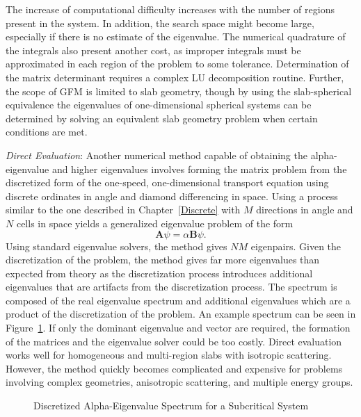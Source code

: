 The increase of computational difficulty increases with the number of regions present in the system. In addition, the search space might become large, especially if there is no estimate of the eigenvalue. The numerical quadrature of the integrals also present another cost, as improper integrals must be approximated in each region of the problem to some tolerance. Determination of the matrix determinant requires a complex LU decomposition routine. Further, the scope of GFM is limited to slab geometry, though by using the slab-spherical equivalence \cite{case1953introduction} the eigenvalues of one-dimensional spherical systems can be determined by solving an equivalent slab geometry problem when certain conditions are met.

\textit{Direct Evaluation}: Another numerical method capable of obtaining the alpha-eigen\-value and higher eigenvalues involves forming the matrix problem from the discretized form of the one-speed, one-dimensional transport equation \cite{modak_simple_2003} using discrete ordinates in angle and diamond differencing in space. Using a process similar to the one described in Chapter~\ref{Discrete} with $M$ directions in angle and $N$ cells in space yields a generalized eigenvalue problem of the form
\begin{equation}
\mathbf{A} \psi = \alpha \mathbf{B} \psi.
\label{eq:geneig}
\end{equation}
Using standard eigenvalue solvers, the method gives $NM$ eigenpairs. Given the discretization of the problem, the method gives far more eigenvalues than expected from theory as the discretization process introduces additional eigenvalues that are artifacts from the discretization process. The spectrum is composed of the real eigenvalue spectrum and additional eigenvalues which are a product of the discretization of the problem. An example spectrum can be seen in Figure~\ref{fig:NMSpec}. If only the dominant eigenvalue and vector are required, the formation of the matrices and the eigenvalue solver could be too costly. Direct evaluation works well for homogeneous and multi-region slabs with isotropic scattering. However, the method quickly becomes complicated and expensive for problems involving complex geometries, anisotropic scattering, and multiple energy groups.

\begin{figure}
\centering
\resizebox{0.5\textwidth}{!}{
	
	}
	\caption{Discretized Alpha-Eigenvalue Spectrum for a Subcritical System}
	\label{fig:NMSpec}
\end{figure}

